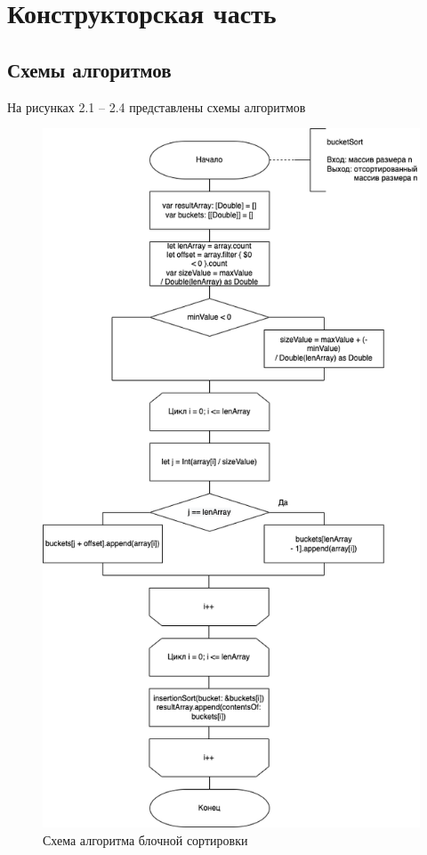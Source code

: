 \chapter{Конструкторская часть}

\section{Схемы алгоритмов}

На рисунках 2.1 -- 2.4 представлены схемы алгоритмов 

\begin{figure}[h!]
	\centering
	\includegraphics[width=0.8\linewidth]{img/Bucket.png}
	\caption{Схема алгоритма блочной сортировки}
	\label{fig:mpr}
\end{figure}

